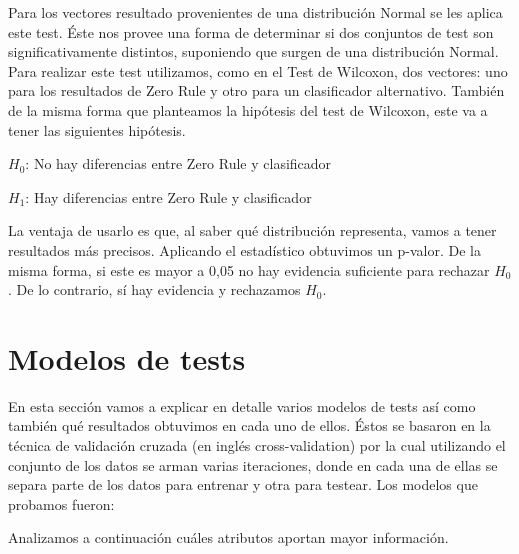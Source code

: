 
Para los vectores resultado provenientes de una distribución Normal se les aplica este test. Éste nos provee una forma de determinar si dos conjuntos de test son significativamente distintos, suponiendo que surgen de una distribución Normal. Para realizar este test utilizamos, como en el Test de Wilcoxon, dos vectores: uno para los resultados de Zero Rule y otro para un clasificador alternativo. 
También de la misma forma que planteamos la hipótesis del test de Wilcoxon, este va a tener las siguientes hipótesis. 

\vspace{0.5cm}
\hspace{2cm}$H_0$: No hay diferencias entre Zero Rule y clasificador
\vspace{0.25cm}

\hspace{2cm}$H_1$: Hay diferencias entre Zero Rule y clasificador
\vspace{0.5cm}

La ventaja de usarlo es que, al saber qué distribución representa, vamos a tener resultados más precisos. Aplicando el estadístico obtuvimos un p-valor. De la misma forma, si este es mayor a 0,05 no hay evidencia suficiente para rechazar $H_0$. De lo contrario, sí hay evidencia y rechazamos $H_0$.

\section{Modelos de tests}

En esta sección vamos a explicar en detalle varios modelos de tests así como también qué resultados obtuvimos en cada uno de ellos. Éstos se basaron en la técnica de validación cruzada (en inglés cross-validation) por la cual utilizando el conjunto de los datos se arman varias iteraciones, donde en cada una de ellas se separa parte de los datos para entrenar y otra para testear. Los modelos que probamos fueron:







Analizamos a continuación cuáles atributos aportan mayor información.


